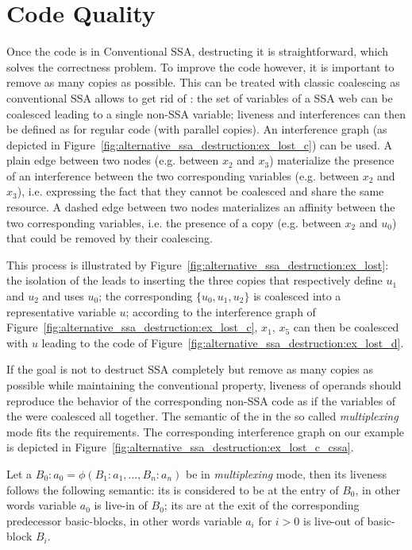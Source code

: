 \section{Code Quality}
Once the code is in Conventional SSA, destructing it is straightforward, which solves the correctness problem. To improve the code however, it
is important to remove as many copies as possible. This can be treated
with classic coalescing as conventional SSA allows to get rid of \phifuns: the set of variables of a SSA web can be coalesced leading to a single non-SSA variable; liveness and
interferences can then be defined as for regular code (with parallel copies). An interference graph (as depicted in Figure~\ref{fig:alternative_ssa_destruction:ex_lost_c}) can be used. A plain edge between two nodes (e.g. between $x_2$ and $x_3$) materialize the presence of an interference between the two corresponding variables (e.g. between $x_2$ and $x_3$), i.e. expressing the fact that they cannot be coalesced and share the same resource. A dashed edge between two nodes materializes an affinity between the two corresponding variables, i.e. the presence of a copy (e.g. between $x_2$ and $u_0$) that could be removed by their coalescing.

This process is illustrated by Figure~\ref{fig:alternative_ssa_destruction:ex_lost}: the isolation of the \phifun leads to inserting the three copies that respectively define $u_1$ and $u_2$ and uses $u_0$; the corresponding \phiweb  $\{u_0, u_1, u_2\}$ is coalesced into a representative variable $u$; according to the interference graph of Figure~\ref{fig:alternative_ssa_destruction:ex_lost_c}, $x_1$, $x_5$ can then be coalesced with $u$ leading to the code of Figure~\ref{fig:alternative_ssa_destruction:ex_lost_d}.

If the goal is not to destruct SSA completely but remove as many copies as possible while maintaining the conventional property, liveness of \phifun operands should reproduce the behavior of the corresponding non-SSA code as if the variables of the \phiweb were coalesced all together. The semantic of the \phiop in the so called \emph{multiplexing} mode
fits the requirements. The corresponding interference graph on our example is depicted in Figure~\ref{fig:alternative_ssa_destruction:ex_lost_c_cssa}.


\begin{definition}
Let a \phifun $B_0:a_0=\phi(B_1:a_1,\dots,B_n:a_n)$ be in \emph{multiplexing} mode, then its liveness follows the following semantic: its  is considered to be at the entry of $B_0$, in other words variable $a_0$ is live-in of $B_0$; its \useops are at the exit of the corresponding predecessor basic-blocks, in other words variable $a_i$ for $i>0$ is live-out of basic-block $B_i$.
\end{definition}


